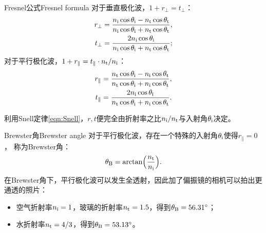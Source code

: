 \begin{theorem}
    {Fresnel公式}{Fresnel formula}
    对于垂直极化波，$1+r_\perp=t_\perp$：
    \begin{subequations}
        \begin{align}
            \label{eqn:Fresnel rperp}
            r_\perp&=\frac{n_\i\cos\theta_\i-n_\t\cos\theta_\t}{n_\i\cos\theta_\i+n_\t\cos\theta_\t},\\%
            \label{eqn:Fresnel tperp}
            t_\perp&=\frac{2n_\i\cos\theta_\i}{n_\i\cos\theta_\i+n_\t\cos\theta_\t};%
        \end{align}
    \end{subequations}
    对于平行极化波，$1+r_\parallel=t_\parallel\cdot n_\text t/n_{\mathrm{i}}$：
    \begin{subequations}
        \begin{align}
            \label{eqn:Fresnel rpara}
            r_\parallel&=\frac{n_\text t\cos\theta_{\mathrm{i}}-n_{\mathrm{i}}\cos\theta_\text t}{n_\text t\cos\theta_{\mathrm{i}}+n_{\mathrm{i}}\cos\theta_\text t},\\
            \label{eqn:Fresnel tpara}
            t_\parallel&=\frac{2n_{\mathrm{i}}\cos\theta_{\mathrm{i}}}{n_\text t\cos\theta_{\mathrm{i}}+n_{\mathrm{i}}\cos\theta_\text t}.
        \end{align}
    \end{subequations}
\end{theorem}
    
利用Snell定律\eqref{eqn:Snell}，$r,t$便完全由折射率之比$n_{\mathrm{i}}/n_\text t$与入射角$\theta_{\mathrm{i}}$决定。

\begin{example}
    {Brewster角}{Brewster angle}
    对于平行极化波，存在一个特殊的入射角$\theta_{\mathrm{i}}$使得$r_\parallel=0$，%
    称为Brewster角：
    \begin{equation}
        \label{eqn:Brewster}
        \theta_\text B=\arctan\Bigl(\frac{n_\text t}{n_{\mathrm{i}}}\Bigr).
    \end{equation}
    在Brewster角下，平行极化波可以发生全透射，因此加了偏振镜的相机可以拍出更通透的照片：
    \begin{itemize}
        \item 空气折射率$n_{\mathrm{i}}=1$，玻璃的折射率$n_\text t=1.5$，得到$\theta_\text B=56.31^\circ$；
        \item 水折射率$n_\text t=4/3$，得到$\theta_\text B=53.13^\circ$。
    \end{itemize}
    
\end{example}

